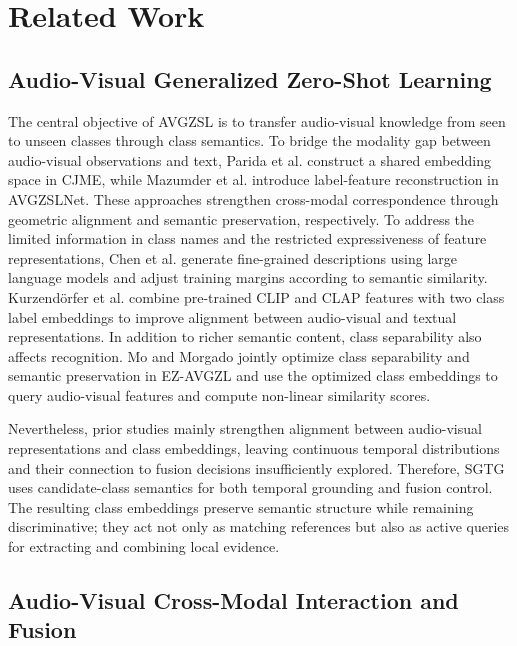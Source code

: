 
\section{Related Work}\label{sec:related-work}

\subsection{Audio-Visual Generalized Zero-Shot Learning}\label{sec:audio-visual-generalized-zero-shot-learning}

The central objective of AVGZSL is to transfer audio-visual knowledge from seen to unseen classes through class semantics. To bridge the modality gap between audio-visual observations and text, Parida et al. \cite{parida2020cjme} construct a shared embedding space in CJME, while Mazumder et al. \cite{mazumder2021avgzslnet} introduce label-feature reconstruction in AVGZSLNet. These approaches strengthen cross-modal correspondence through geometric alignment and semantic preservation, respectively. To address the limited information in class names and the restricted expressiveness of feature representations, Chen et al. \cite{chen2023kda} generate fine-grained descriptions using large language models and adjust training margins according to semantic similarity. Kurzend\"{o}rfer et al. \cite{kurzendorfer2024clipclap} combine pre-trained CLIP and CLAP features with two class label embeddings to improve alignment between audio-visual and textual representations. In addition to richer semantic content, class separability also affects recognition. Mo and Morgado \cite{mo2024easy} jointly optimize class separability and semantic preservation in EZ-AVGZL and use the optimized class embeddings to query audio-visual features and compute non-linear similarity scores.

Nevertheless, prior studies mainly strengthen alignment between audio-visual representations and class embeddings, leaving continuous temporal distributions and their connection to fusion decisions insufficiently explored. Therefore, SGTG uses candidate-class semantics for both temporal grounding and fusion control. The resulting class embeddings preserve semantic structure while remaining discriminative; they act not only as matching references but also as active queries for extracting and combining local evidence.

\subsection{Audio-Visual Cross-Modal Interaction and Fusion}\label{sec:audio-visual-cross-modal-interaction-and-fusion}

